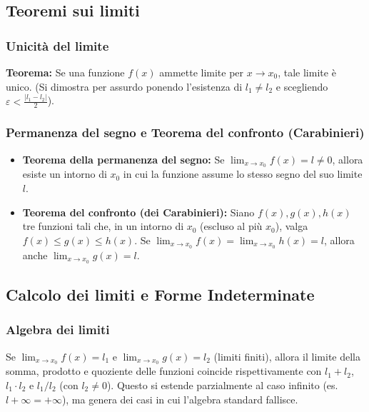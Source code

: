 \subsection{Teoremi sui limiti}
\subsubsection{Unicità del limite}
\textbf{Teorema:} Se una funzione $f(x)$ ammette limite per $x \to x_0$, tale limite è unico. (Si dimostra per assurdo ponendo l'esistenza di $l_1 \neq l_2$ e scegliendo $\varepsilon < \frac{|l_1-l_2|}{2}$).

\subsubsection{Permanenza del segno e Teorema del confronto (Carabinieri)}
\begin{itemize}
    \item \textbf{Teorema della permanenza del segno:} Se $\lim_{x \to x_0} f(x) = l \neq 0$, allora esiste un intorno di $x_0$ in cui la funzione assume lo stesso segno del suo limite $l$.
    \item \textbf{Teorema del confronto (dei Carabinieri):} Siano $f(x), g(x), h(x)$ tre funzioni tali che, in un intorno di $x_0$ (escluso al più $x_0$), valga $f(x) \le g(x) \le h(x)$. Se $\lim_{x \to x_0} f(x) = \lim_{x \to x_0} h(x) = l$, allora anche $\lim_{x \to x_0} g(x) = l$.
\end{itemize}

\subsection{Calcolo dei limiti e Forme Indeterminate}
\subsubsection{Algebra dei limiti}
Se $\lim_{x \to x_0} f(x) = l_1$ e $\lim_{x \to x_0} g(x) = l_2$ (limiti finiti), allora il limite della somma, prodotto e quoziente delle funzioni coincide rispettivamente con $l_1+l_2$, $l_1 \cdot l_2$ e $l_1/l_2$ (con $l_2 \neq 0$). Questo si estende parzialmente al caso infinito (es. $l + \infty = +\infty$), ma genera dei casi in cui l'algebra standard fallisce.

